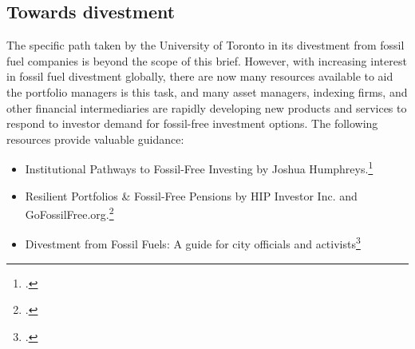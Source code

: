 		\subsection{Towards divestment}



The specific path taken by the University of Toronto in its divestment from fossil fuel companies is beyond the scope of this brief.
However, with increasing interest in fossil fuel divestment globally, there are now many resources available to aid the portfolio managers is this task, and many asset managers, indexing firms, and other financial intermediaries are rapidly developing new products and services to respond to investor demand for fossil-free investment options.
The following resources provide valuable guidance:
\begin{itemize}
	\item Institutional Pathways to Fossil-Free Investing by Joshua Humphreys.\footcite[][]{FossilFreeInvesting}
	\item Resilient Portfolios \& Fossil-Free Pensions by HIP Investor Inc. and GoFossilFree.org.\footcite[][]{ResPortFFPensions}
	\item Divestment from Fossil Fuels: A guide for city officials and activists\footcite[][]{MayorsInnovationDivestGuide}
\end{itemize}



